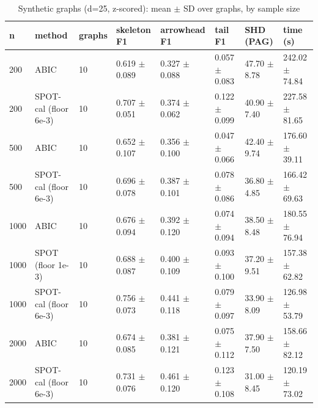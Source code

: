 \begin{table}[t]
\centering\footnotesize
\caption{Synthetic graphs (d=25, z-scored): mean $\pm$ SD over graphs, by sample size}\label{tab:T1a_synthetic_sample_size}
\begin{tabular}{@{}llllllll@{}}
\toprule
n & method & graphs & skeleton F1 & arrowhead F1 & tail F1 & SHD (PAG) & time (s)\\
\midrule
200 & ABIC & 10 & 0.619 $\pm$ 0.089 & 0.327 $\pm$ 0.088 & 0.057 $\pm$ 0.083 & 47.70 $\pm$ 8.78 & 242.02 $\pm$ 74.84\\
200 & SPOT-cal (floor 6e-3) & 10 & 0.707 $\pm$ 0.051 & 0.374 $\pm$ 0.062 & 0.122 $\pm$ 0.099 & 40.90 $\pm$ 7.40 & 227.58 $\pm$ 81.65\\
500 & ABIC & 10 & 0.652 $\pm$ 0.107 & 0.356 $\pm$ 0.100 & 0.047 $\pm$ 0.066 & 42.40 $\pm$ 9.74 & 176.60 $\pm$ 39.11\\
500 & SPOT-cal (floor 6e-3) & 10 & 0.696 $\pm$ 0.078 & 0.387 $\pm$ 0.101 & 0.078 $\pm$ 0.086 & 36.80 $\pm$ 4.85 & 166.42 $\pm$ 69.63\\
1000 & ABIC & 10 & 0.676 $\pm$ 0.094 & 0.392 $\pm$ 0.120 & 0.074 $\pm$ 0.094 & 38.50 $\pm$ 8.48 & 180.55 $\pm$ 76.94\\
1000 & SPOT (floor 1e-3) & 10 & 0.688 $\pm$ 0.087 & 0.400 $\pm$ 0.109 & 0.093 $\pm$ 0.100 & 37.20 $\pm$ 9.51 & 157.38 $\pm$ 62.82\\
1000 & SPOT-cal (floor 6e-3) & 10 & 0.756 $\pm$ 0.073 & 0.441 $\pm$ 0.118 & 0.079 $\pm$ 0.097 & 33.90 $\pm$ 8.09 & 126.98 $\pm$ 53.79\\
2000 & ABIC & 10 & 0.674 $\pm$ 0.085 & 0.381 $\pm$ 0.121 & 0.075 $\pm$ 0.112 & 37.90 $\pm$ 7.50 & 158.66 $\pm$ 82.12\\
2000 & SPOT-cal (floor 6e-3) & 10 & 0.731 $\pm$ 0.076 & 0.461 $\pm$ 0.120 & 0.123 $\pm$ 0.108 & 31.00 $\pm$ 8.45 & 120.19 $\pm$ 73.02\\
\bottomrule
\end{tabular}
\end{table}

